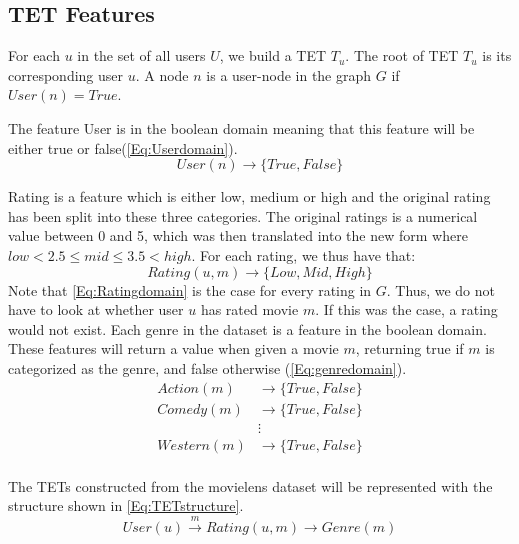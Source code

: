 \subsection{TET Features}


For each $u$ in the set of all users $U$, we build a TET $T_u$. The root of TET $T_u$ is its corresponding user $u$.
A node $n$ is a user-node in the graph $G$ if $User(n) = True$.

The feature User is in the boolean domain meaning that this feature will be either true or false(\autoref{Eq:Userdomain}).
\begin{equation}\label{Eq:Userdomain}
  User(n)\rightarrow \{True, False\}
\end{equation}


Rating is a feature which is either low, medium or high and the original rating has been split into these three categories.
The original ratings is a numerical value between 0 and 5, which was then translated into the new form where $low<2.5\leq mid \leq 3.5<high$.
For each rating, we thus have that:
\begin{equation}\label{Eq:Ratingdomain}
    Rating(u, m) \rightarrow \{Low, Mid, High\}
\end{equation}
Note that \autoref{Eq:Ratingdomain} is the case for every rating in $G$. Thus, we do not have to look at whether user $u$ has rated movie $m$. If this was the case, a rating would not exist.
Each genre in the dataset is a feature in the boolean domain. These features will return a value when given a movie $m$, returning true if $m$ is categorized as the genre, and false otherwise (\autoref{Eq:genredomain}).
\begin{equation}\label{Eq:genredomain}
\begin{aligned}
Action(m)& \rightarrow \{True, False\} \\
Comedy(m)& \rightarrow \{True, False\} \\
&\vdots \\
Western(m)& \rightarrow \{True, False\} \\
\end{aligned}
\end{equation}

The TETs constructed from the movielens dataset will be represented with the structure shown in \autoref{Eq:TETstructure}.
\begin{equation}\label{Eq:TETstructure}
User(u) \stackrel{m}{\longrightarrow} Rating(u,m) \longrightarrow Genre(m)
\end{equation}

